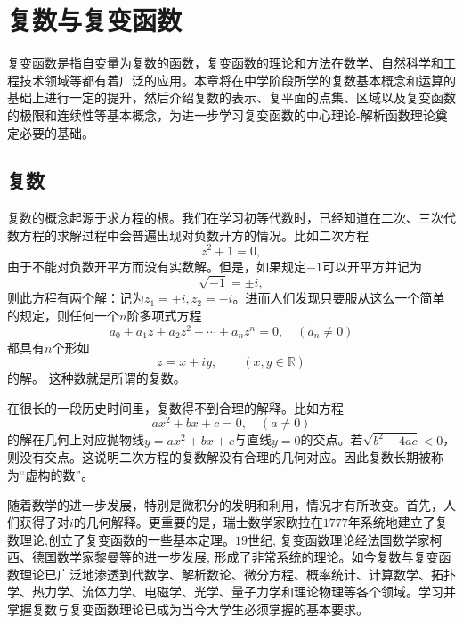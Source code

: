 \chapter{复数与复变函数}
复变函数是指自变量为复数的函数，复变函数的理论和方法在数学、自然科学和工程技术领域等都有着广泛的应用。本章将在中学阶段所学的复数基本概念和运算的基础上进行一定的提升，然后介绍复数的表示、复平面的点集、区域以及复变函数的极限和连续性等基本概念，为进一步学习复变函数的中心理论-解析函数理论奠定必要的基础。



\section{复数}\label{sec:complex_number}

复数的概念起源于求方程的根。我们在学习初等代数时，已经知道在二次、三次代数方程的求解过程中会普遍出现对负数开方的情况。比如二次方程
\[ z^2+1 =0,\]
由于不能对负数开平方而没有实数解。但是，如果规定$-1$可以开平方并记为
\begin{equation}
    \sqrt{-1} =  \pm i,
\end{equation}
则此方程有两个解：记为$ z_{1}= +i, z_{2}= - i$。进而人们发现只要服从这么一个简单的规定，则任何一个$n$阶多项式方程
\[ a_0 + a_1 z + a_2 z^2 + \cdots + a_n z^n =0, \quad (a_n \ne 0)\]
都具有$n$个形如
\begin{equation}\label{eq:fsxc}
    z = x+iy, \qquad (x,y \in \mathbb{R}) 
\end{equation}
的解。 这种数就是所谓的复数。

在很长的一段历史时间里，复数得不到合理的解释。比如方程
$$ax^2 +bx + c= 0, \quad (a\ne 0)$$
的解在几何上对应抛物线$y=ax^2 +bx + c$与直线$y=0$的交点。若$\sqrt{b^2-4ac} <0$，则没有交点。这说明二次方程的复数解没有合理的几何对应。因此复数长期被称为“虚构的数”。

随着数学的进一步发展，特别是微积分的发明和利用，情况才有所改变。首先，人们获得了对$i$的几何解释。更重要的是，瑞士数学家欧拉在$1777$年系统地建立了复数理论,创立了复变函数的一些基本定理。$19$世纪, 复变函数理论经法国数学家柯西、德国数学家黎曼等的进一步发展, 形成了非常系统的理论。如今复数与复变函数理论已广泛地渗透到代数学、解析数论、微分方程、概率统计、计算数学、拓扑学、热力学、流体力学、电磁学、光学、量子力学和理论物理等各个领域。学习并掌握复数与复变函数理论已成为当今大学生必须掌握的基本要求。\\

